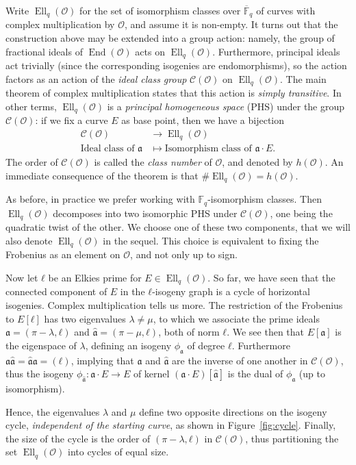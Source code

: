 \documentclass{llncs}
\newcommand{\F}{\mathbb{F}}
\newcommand{\Fbar}{\overline{\mathbb{F}}}
\newcommand{\Cl}{\mathcal{C}}
\renewcommand{\O}{\mathcal{O}}
\renewcommand{\frak}{\mathfrak}
\DeclareMathOperator{\End}{End}
\DeclareMathOperator{\Ell}{Ell}
\begin{document}
Write $\Ell_q(\O)$ for the set of isomorphism classes over $\Fbar_q$
of curves with complex multiplication by $\O$, and assume it is
non-empty. It turns out that the construction above may be extended
into a group action: namely, the group of fractional ideals of
$\End(\O)$ acts on $\Ell_q(\O)$. Furthermore, principal ideals act
trivially (since the corresponding isogenies are endomorphisms), 
so the action factors as an action of the \emph{ideal
  class group} $\Cl(\O)$ on $\Ell_q(\O)$.  The main theorem of complex
multiplication states that this action is \emph{simply transitive}. In
other terms, $\Ell_q(\O)$ is a \emph{principal homogeneous space} (PHS)
under the group $\Cl(\O)$: if we fix a curve $E$ as base point,
then we have a bijection
\[
\begin{aligned}
\Cl(\O) &\longrightarrow \Ell_q(\O) \\
\text{Ideal class of }\frak a &\longmapsto \text{Isomorphism class of }\frak a\cdot E.
\end{aligned}
\]
The order of $\Cl(\O)$ is called the \emph{class number} of $\O$, and
denoted by $h(\O)$. An immediate consequence of the theorem is that
$\#\Ell_q(\O)=h(\O)$.

As before, in practice we prefer working with $\F_q$-isomorphism classes.
Then $\Ell_q(\O)$ decomposes into two isomorphic PHS under $\Cl(\O)$,
one being the quadratic twist of the other. We choose one of these
two components, that we will also denote $\Ell_q(\O)$ in the sequel.
This choice is equivalent to fixing the Frobenius as an element on $\O$,
and not only up to sign. 

Now let $ℓ$ be an Elkies prime for $E\in\Ell_q(\O)$. So far, we have seen that the
connected component of $E$ in the $ℓ$-isogeny graph is a cycle of
horizontal isogenies. Complex multiplication tells us more. The
restriction of the Frobenius to $E[ℓ]$ has two eigenvalues $λ≠μ$, to
which we associate the prime ideals $\frak a=(π-λ,ℓ)$ and
$\hat{\frak a}=(π-μ,ℓ)$, both of norm $ℓ$. We see then that
$E[\frak a]$ is the eigenspace of $λ$, defining an isogeny
$ϕ_{\frak{a}}$ of degree $ℓ$. Furthermore
$\frak a\hat{\frak a} = \hat{\frak a}\frak a = (ℓ)$, implying that
$\frak a$ and $\hat{\frak a}$ are the inverse of one another in
$\Cl(\O)$, thus the isogeny $ϕ_{\hat{\frak a}}:\frak a·E→E$ of
kernel $(\frak a·E)[\hat{\frak a}]$ is the dual of $ϕ_{\frak a}$ (up
to isomorphism). 

Hence, 
the eigenvalues $λ$ and $μ$ define two opposite directions on the isogeny cycle,
\emph{independent of the starting curve},
as shown in Figure~\ref{fig:cycle}.  
Finally, the size of the cycle is the order of $(π-λ,ℓ)$ in $\Cl(\O)$,
thus partitioning the set $\Ell_q(\O)$ into cycles of equal size.
\end{document}
